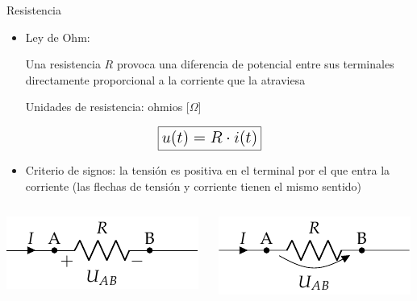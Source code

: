 \documentclass[aspectratio=169, xcolor={usenames,svgnames,dvipsnames}]{beamer}
\begin{document}
\begin{frame}{Resistencia}
    \begin{itemize}
        \item \alert{\large Ley de Ohm}: 
        \vspace{2mm}
        
        Una resistencia $R$ provoca una \alert{diferencia de potencial} entre sus terminales \alert{directamente proporcional} a la corriente que la atraviesa
        
        \vspace{2mm}
        Unidades de resistencia: ohmios [\(\Omega\)] 
    \end{itemize}
    \vspace{3mm}
    \[
    \Large \boxed{u(t) = R \cdot i(t)}
    \]
    \begin{itemize}
        \item \alert{Criterio de signos}: la tensión es positiva en el terminal por el que entra la corriente (las flechas de tensión y corriente tienen el mismo sentido)
    \end{itemize}
    \begin{columns}
        \begin{column}{0.5\columnwidth}
            \begin{center}
            \includegraphics[height=0.2\textheight]{../figs/Resistencia.pdf}
            \end{center}
        \end{column}
        \begin{column}{0.5\columnwidth}
            \begin{center}
            \includegraphics[height=0.2\textheight]{../figs/Resistencia_Flecha.pdf}
            \end{center}
        \end{column}
    \end{columns}
\end{frame}
\end{document}
